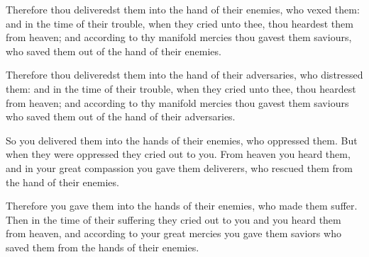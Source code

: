 			Therefore thou deliveredst them into the hand of their enemies, who vexed them: and in the time of their trouble, when they cried unto thee, thou heardest them from heaven; and according to thy manifold mercies thou gavest them saviours, who saved them out of the hand of their enemies.

			\begin{versebox}
					\item[BHS] 
					\item[LXX] 
					\item[ASV] Therefore thou deliveredst them into the hand of their adversaries, who distressed them: and in the time of their trouble, when they cried unto thee, thou heardest from heaven; and according to thy manifold mercies thou gavest them saviours who saved them out of the hand of their adversaries.
					\item[NIV] So you delivered them into the hands of their enemies, who oppressed them. But when they were oppressed they cried out to you. From heaven you heard them, and in your great compassion you gave them deliverers, who rescued them from the hand of their enemies.
					\item[NRSV] Therefore you gave them into the hands of their enemies, who made them suffer. Then in the time of their suffering they cried out to you and you heard them from heaven, and according to your great mercies you gave them saviors who saved them from the hands of their enemies.
			\end{versebox}

